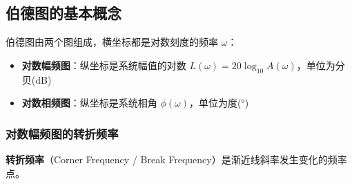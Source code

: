 \subsection{伯德图的基本概念}

伯德图由两个图组成，横坐标都是对数刻度的频率 $\omega$：
\begin{itemize}
    \item \textbf{对数幅频图}：纵坐标是系统幅值的对数 $L(\omega) = 20\log_{10}A(\omega)$，单位为分贝(dB)
    \item \textbf{对数相频图}：纵坐标是系统相角 $\phi(\omega)$，单位为度(°)
\end{itemize}

\subsubsection{对数幅频图的转折频率}

\textbf{转折频率}（Corner Frequency / Break Frequency）是渐近线斜率发生变化的频率点。

